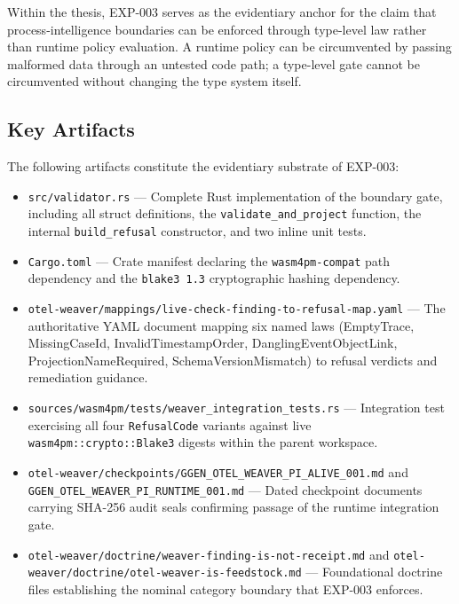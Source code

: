 Within the thesis, EXP-003 serves as the evidentiary anchor for the claim that
process-intelligence boundaries can be enforced through type-level law rather than
runtime policy evaluation. A runtime policy can be circumvented by passing malformed
data through an untested code path; a type-level gate cannot be circumvented without
changing the type system itself.

\subsection{Key Artifacts}
\label{sec:otel-weaver-exp-003-live-check-to-refusal-identity-artifacts}

The following artifacts constitute the evidentiary substrate of EXP-003:

\begin{itemize}
  \item \texttt{src/validator.rs} --- Complete Rust implementation of the boundary gate,
        including all struct definitions, the \texttt{validate\_and\_project} function,
        the internal \texttt{build\_refusal} constructor, and two inline unit tests.
  \item \texttt{Cargo.toml} --- Crate manifest declaring the \texttt{wasm4pm-compat}
        path dependency and the \texttt{blake3 1.3} cryptographic hashing dependency.
  \item \texttt{otel-weaver/mappings/live-check-finding-to-refusal-map.yaml} --- The
        authoritative YAML document mapping six named laws (EmptyTrace, MissingCaseId,
        InvalidTimestampOrder, DanglingEventObjectLink, ProjectionNameRequired,
        SchemaVersionMismatch) to refusal verdicts and remediation guidance.
  \item \texttt{sources/wasm4pm/tests/weaver\_integration\_tests.rs} --- Integration
        test exercising all four \texttt{RefusalCode} variants against live
        \texttt{wasm4pm::crypto::Blake3} digests within the parent workspace.
  \item \texttt{otel-weaver/checkpoints/GGEN\_OTEL\_WEAVER\_PI\_ALIVE\_001.md} and
        \texttt{GGEN\_OTEL\_WEAVER\_PI\_RUNTIME\_001.md} --- Dated checkpoint documents
        carrying SHA-256 audit seals confirming passage of the runtime integration gate.
  \item \texttt{otel-weaver/doctrine/weaver-finding-is-not-receipt.md} and
        \texttt{otel-weaver/doctrine/otel-weaver-is-feedstock.md} --- Foundational
        doctrine files establishing the nominal category boundary that EXP-003 enforces.
\end{itemize}
